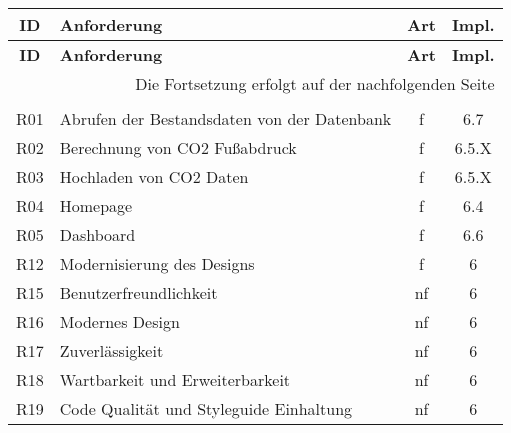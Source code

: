 \begin{longtable}{|c|l|c|c|}

    \hline
    \textbf{ID}          &
    \textbf{Anforderung} &
    \textbf{Art}         &
    \textbf{Impl.}                                                                         \\ \hline
    \endfirsthead

    \hline
    \textbf{ID}          &
    \textbf{Anforderung} &
    \textbf{Art}         &
    \textbf{Impl.}                                                                         \\ \hline
    \endhead

    \hline
    \multicolumn{4}{|r|}{{Die Fortsetzung erfolgt auf der nachfolgenden Seite}}            \\ \hline
    \endfoot

    \endlastfoot

    \multicolumn{4}{|c|}{\textbf{Muss-Anforderungen}}                                      \\ \hline

    R01                  & Abrufen der Bestandsdaten von der Datenbank        & f  & 6.7   \\ \hline
    R02                  & Berechnung von CO2 Fußabdruck                      & f  & 6.5.X \\ \hline
    R03                  & Hochladen von CO2 Daten                            & f  & 6.5.X \\ \hline
    R04                  & Homepage                                           & f  & 6.4   \\ \hline
    R05                  & Dashboard                                          & f  & 6.6   \\ \hline
    R12                  & Modernisierung des Designs                         & f  & 6     \\ \hline
    R15                  & Benutzerfreundlichkeit                             & nf & 6     \\ \hline
    R16                  & Modernes Design                                    & nf & 6     \\ \hline
    R17                  & Zuverlässigkeit                                    & nf & 6     \\ \hline
    R18                  & Wartbarkeit und Erweiterbarkeit                    & nf & 6     \\ \hline
    R19                  & Code Qualität und Styleguide Einhaltung            & nf & 6     \\ \hline


\end{longtable}
